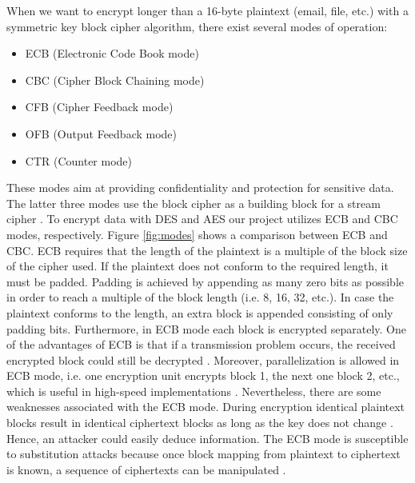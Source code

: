 When we want to encrypt longer than a 16-byte plaintext (email, file, etc.) with a symmetric key block cipher algorithm, there exist several modes of operation:
\begin{itemize}
\item ECB (Electronic Code Book mode)
\end{itemize}
\begin{itemize}
\item CBC (Cipher Block Chaining mode)
\end{itemize}
\begin{itemize}
\item CFB (Cipher Feedback mode) 
\end{itemize}
\begin{itemize}
\item OFB (Output Feedback mode)
\end{itemize}
\begin{itemize}
\item CTR (Counter mode)
\end{itemize}
These modes aim at providing confidentiality and protection for sensitive data. The latter three modes use the block cipher as a building block for a stream cipher \cite{springer2010}. To encrypt data with DES and AES our project utilizes ECB and CBC modes, respectively. Figure \ref{fig:modes} shows a comparison between ECB and CBC. ECB requires that the length of the plaintext is a multiple of the block size of the cipher used. If the plaintext does not conform to the required length, it must be padded. Padding is achieved by appending as many zero bits as possible in order to reach a multiple of the block length (i.e. 8, 16, 32, etc.). In case the plaintext conforms to the length, an extra block is appended consisting of only padding bits. Furthermore, in ECB mode each block is encrypted separately. One of the advantages of ECB is that if a transmission problem occurs, the received encrypted block could still be decrypted \cite{springer2010}. Moreover, parallelization is allowed in ECB mode, i.e. one encryption unit encrypts block 1, the next one block 2, etc., which is useful in high-speed implementations \cite{springer2010}. Nevertheless, there are some weaknesses associated with the ECB mode. During encryption identical plaintext blocks result in identical ciphertext blocks as long as the key does not change \cite{springer2010}. Hence, an attacker could easily deduce information. The ECB mode is susceptible to substitution attacks because once block mapping from plaintext to ciphertext is known, a sequence of ciphertexts can be manipulated \cite{springer2010}. 
